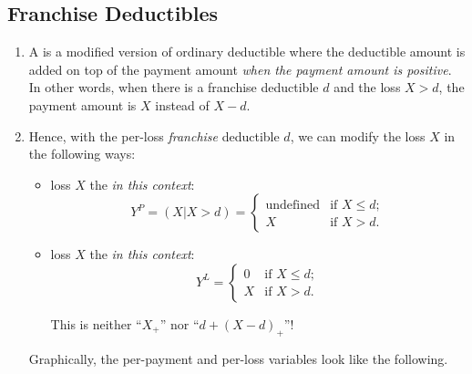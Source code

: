 \subsection{Franchise Deductibles}
\begin{enumerate}
\item A  is a modified version of ordinary
deductible where the deductible amount is added on top of the payment amount
 \emph{when the payment amount  is
positive}. In other words, when there is a franchise deductible \(d\) and the
loss \(X>d\), the payment amount is \(X\) instead of \(X-d\).

\item Hence, with the per-loss \emph{franchise} deductible \(d\), we can modify
the loss \(X\) in the following ways:
\begin{itemize}
\item loss \(X\)  the  \emph{in
this context}:
\[
Y^P=(X|X>d)=\begin{cases}
\text{undefined}&\text{if \(X\le d\)};\\
X&\text{if \(X>d\)}.
\end{cases}
\]
\item loss \(X\)  the  \emph{in
this context}:
\[
Y^L
=\begin{cases}
0&\text{if \(X\le d\)};\\
X&\text{if \(X>d\)}.
\end{cases}
\]
\begin{warning}
This is neither ``\(X_{+}\)'' nor ``\(d+(X-d)_{+}\)''!
\end{warning}
\end{itemize}


Graphically, the per-payment and per-loss variables look like the following.



\end{enumerate}
